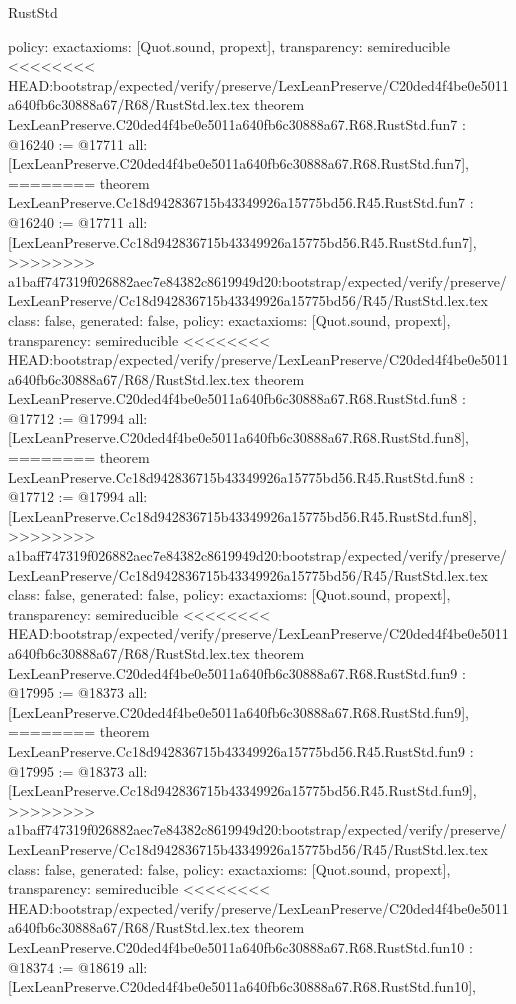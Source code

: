 \begin{lexlean}{RustStd}
\begin{coremodule}
{\begin{coremodule}
{{{{{{{{{{  policy: exact{axioms: [Quot.sound, propext]},
  transparency: semireducible
}
<<<<<<<< HEAD:bootstrap/expected/verify/preserve/LexLeanPreserve/C20ded4f4be0e5011a640fb6c30888a67/R68/RustStd.lex.tex
theorem LexLeanPreserve.C20ded4f4be0e5011a640fb6c30888a67.R68.RustStd.fun7 : @16240 := @17711 {
  all: [LexLeanPreserve.C20ded4f4be0e5011a640fb6c30888a67.R68.RustStd.fun7],
========
theorem LexLeanPreserve.Cc18d942836715b43349926a15775bd56.R45.RustStd.fun7 : @16240 := @17711 {
  all: [LexLeanPreserve.Cc18d942836715b43349926a15775bd56.R45.RustStd.fun7],
>>>>>>>> a1baff747319f026882aec7e84382c8619949d20:bootstrap/expected/verify/preserve/LexLeanPreserve/Cc18d942836715b43349926a15775bd56/R45/RustStd.lex.tex
  class: false,
  generated: false,
  policy: exact{axioms: [Quot.sound, propext]},
  transparency: semireducible
}
<<<<<<<< HEAD:bootstrap/expected/verify/preserve/LexLeanPreserve/C20ded4f4be0e5011a640fb6c30888a67/R68/RustStd.lex.tex
theorem LexLeanPreserve.C20ded4f4be0e5011a640fb6c30888a67.R68.RustStd.fun8 : @17712 := @17994 {
  all: [LexLeanPreserve.C20ded4f4be0e5011a640fb6c30888a67.R68.RustStd.fun8],
========
theorem LexLeanPreserve.Cc18d942836715b43349926a15775bd56.R45.RustStd.fun8 : @17712 := @17994 {
  all: [LexLeanPreserve.Cc18d942836715b43349926a15775bd56.R45.RustStd.fun8],
>>>>>>>> a1baff747319f026882aec7e84382c8619949d20:bootstrap/expected/verify/preserve/LexLeanPreserve/Cc18d942836715b43349926a15775bd56/R45/RustStd.lex.tex
  class: false,
  generated: false,
  policy: exact{axioms: [Quot.sound, propext]},
  transparency: semireducible
}
<<<<<<<< HEAD:bootstrap/expected/verify/preserve/LexLeanPreserve/C20ded4f4be0e5011a640fb6c30888a67/R68/RustStd.lex.tex
theorem LexLeanPreserve.C20ded4f4be0e5011a640fb6c30888a67.R68.RustStd.fun9 : @17995 := @18373 {
  all: [LexLeanPreserve.C20ded4f4be0e5011a640fb6c30888a67.R68.RustStd.fun9],
========
theorem LexLeanPreserve.Cc18d942836715b43349926a15775bd56.R45.RustStd.fun9 : @17995 := @18373 {
  all: [LexLeanPreserve.Cc18d942836715b43349926a15775bd56.R45.RustStd.fun9],
>>>>>>>> a1baff747319f026882aec7e84382c8619949d20:bootstrap/expected/verify/preserve/LexLeanPreserve/Cc18d942836715b43349926a15775bd56/R45/RustStd.lex.tex
  class: false,
  generated: false,
  policy: exact{axioms: [Quot.sound, propext]},
  transparency: semireducible
}
<<<<<<<< HEAD:bootstrap/expected/verify/preserve/LexLeanPreserve/C20ded4f4be0e5011a640fb6c30888a67/R68/RustStd.lex.tex
theorem LexLeanPreserve.C20ded4f4be0e5011a640fb6c30888a67.R68.RustStd.fun10 : @18374 := @18619 {
  all: [LexLeanPreserve.C20ded4f4be0e5011a640fb6c30888a67.R68.RustStd.fun10],
}}}}}}}}}}}}}
\end{coremodule}}
\end{coremodule}
\end{lexlean}
